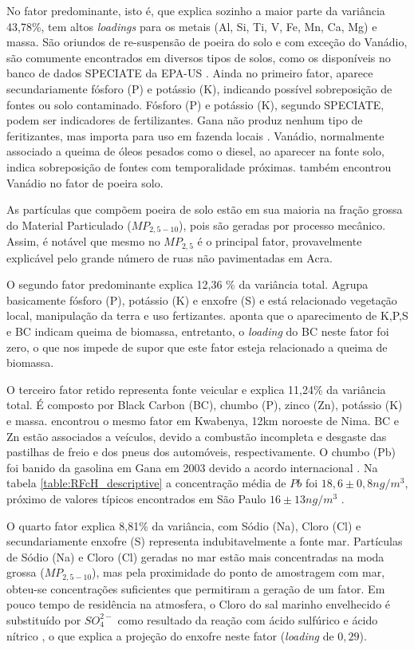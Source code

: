No fator predominante, isto é, que explica sozinho a maior parte da variância 
43,78\%, tem altos \textit{loadings} para os metais (Al, Si, Ti, V, Fe, Mn, Ca, 
Mg) e massa. São oriundos de re-suspensão de poeira do solo e com exceção do 
Vanádio, são comumente encontrados em diversos tipos de solos, 
como os disponíveis no banco de dados SPECIATE da EPA-US \citep{simon2010}.
Ainda no primeiro fator, aparece secundariamente fósforo (P) e potássio (K), 
indicando possível sobreposição de fontes ou solo contaminado. 
Fósforo (P) e potássio (K), segundo SPECIATE, podem ser indicadores de 
fertilizantes. Gana não produz nenhum tipo de feritizantes, mas importa para 
uso em fazenda locais \citep{fianko2011}. 
Vanádio, normalmente associado a queima de óleos pesados como o diesel, ao 
aparecer na fonte solo, indica sobreposição de fontes com temporalidade próximas.
\citet{aboh2009} também encontrou Vanádio no fator de poeira solo.

As partículas que compõem poeira de solo estão em sua maioria na fração
grossa do Material Particulado ($MP_{2,5-10}$), pois são geradas por processo 
mecânico. Assim, é notável que mesmo no $MP_{2,5}$ é o principal fator, 
provavelmente explicável pelo grande número de ruas não pavimentadas em Acra. 

O segundo fator predominante explica 12,36 \% da variância total. 
Agrupa basicamente fósforo (P), potássio (K) e enxofre (S) e está relacionado
vegetação local, manipulação da terra e uso fertizantes. 
\citet{reid2005} aponta que o aparecimento de K,P,S e BC indicam queima de
biomassa, entretanto, o \textit{loading} do BC neste fator foi zero, o que nos
impede de supor que este fator esteja relacionado a queima de biomassa. 

O terceiro fator retido representa fonte veicular e explica 11,24\% da variância
total. É composto por Black Carbon (BC), chumbo (P), zinco (Zn), potássio (K) e 
massa. \citet{aboh2009} encontrou o mesmo fator em Kwabenya, 12km noroeste de 
Nima. BC e Zn estão associados a veículos, devido a combustão 
incompleta e desgaste das pastilhas de freio e dos pneus dos automóveis, 
respectivamente. O chumbo (Pb) foi banido da gasolina em Gana em 2003 devido 
a acordo internacional \citep{epa2015}.  
Na tabela \ref{table:RFcH_descriptive} a concentração média de $Pb$ 
foi $18,6 \pm 0,8 n g /m^3$, próximo de valores típicos encontrados em São Paulo 
$16 \pm 13 n g /m^3$ \citep{andrade2012}.

O quarto fator explica 8,81\% da variância, com Sódio (Na), Cloro (Cl) e
secundariamente enxofre (S) representa indubitavelmente a fonte mar. 
Partículas de Sódio (Na) e Cloro (Cl) geradas no mar estão mais concentradas 
na moda grossa ($MP_{2,5-10}$), mas pela proximidade do ponto de amostragem 
com mar, obteu-se concentrações suficientes que permitiram a geração de um fator. 
Em pouco tempo de residência na atmosfera, o Cloro do sal marinho envelhecido 
é substituído por $SO_4^{2-}$ como resultado da reação com ácido sulfúrico e 
ácido nítrico \citep{mcinnes1994}, o que explica a projeção do enxofre neste
fator (\textit{loading} de $0,29$).

